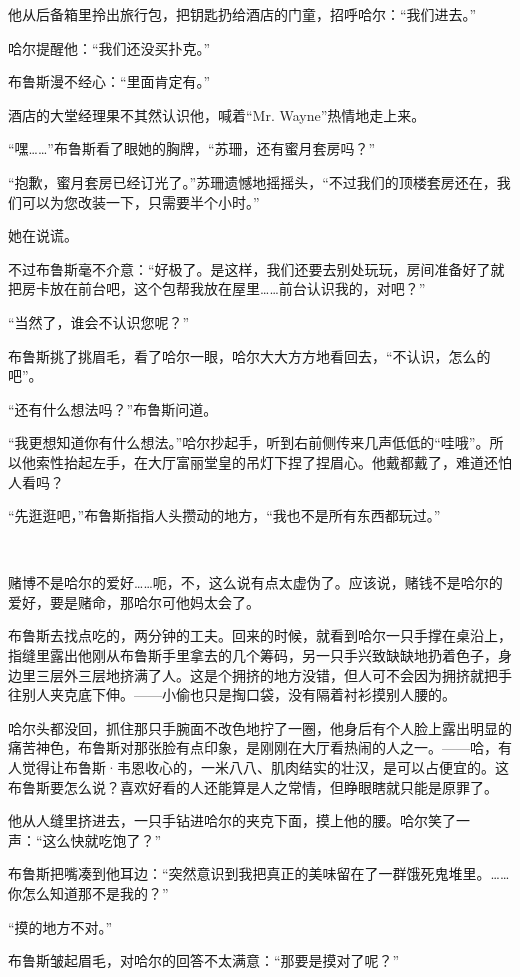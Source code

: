\documentclass[../main]{subfiles}
\begin{document}
他从后备箱里拎出旅行包，把钥匙扔给酒店的门童，招呼哈尔：“我们进去。”

哈尔提醒他：“我们还没买扑克。”

布鲁斯漫不经心：“里面肯定有。”

酒店的大堂经理果不其然认识他，喊着“Mr. Wayne”热情地走上来。

“嘿……”布鲁斯看了眼她的胸牌，“苏珊，还有蜜月套房吗？”

“抱歉，蜜月套房已经订光了。”苏珊遗憾地摇摇头，“不过我们的顶楼套房还在，我们可以为您改装一下，只需要半个小时。”

她在说谎。

不过布鲁斯毫不介意：“好极了。是这样，我们还要去别处玩玩，房间准备好了就把房卡放在前台吧，这个包帮我放在屋里……前台认识我的，对吧？”

“当然了，谁会不认识您呢？”

布鲁斯挑了挑眉毛，看了哈尔一眼，哈尔大大方方地看回去，“不认识，怎么的吧”。

“还有什么想法吗？”布鲁斯问道。

“我更想知道你有什么想法。”哈尔抄起手，听到右前侧传来几声低低的“哇哦”。所以他索性抬起左手，在大厅富丽堂皇的吊灯下捏了捏眉心。他戴都戴了，难道还怕人看吗？

“先逛逛吧，”布鲁斯指指人头攒动的地方，“我也不是所有东西都玩过。”

~\

赌博不是哈尔的爱好……呃，不，这么说有点太虚伪了。应该说，赌钱不是哈尔的爱好，要是赌命，那哈尔可他妈太会了。

布鲁斯去找点吃的，两分钟的工夫。回来的时候，就看到哈尔一只手撑在桌沿上，指缝里露出他刚从布鲁斯手里拿去的几个筹码，另一只手兴致缺缺地扔着色子，身边里三层外三层地挤满了人。这是个拥挤的地方没错，但人可不会因为拥挤就把手往别人夹克底下伸。——小偷也只是掏口袋，没有隔着衬衫摸别人腰的。

哈尔头都没回，抓住那只手腕面不改色地拧了一圈，他身后有个人脸上露出明显的痛苦神色，布鲁斯对那张脸有点印象，是刚刚在大厅看热闹的人之一。——哈，有人觉得让布鲁斯·韦恩收心的，一米八八、肌肉结实的壮汉，是可以占便宜的。这布鲁斯要怎么说？喜欢好看的人还能算是人之常情，但睁眼瞎就只能是原罪了。

他从人缝里挤进去，一只手钻进哈尔的夹克下面，摸上他的腰。哈尔笑了一声：“这么快就吃饱了？”

布鲁斯把嘴凑到他耳边：“突然意识到我把真正的美味留在了一群饿死鬼堆里。……你怎么知道那不是我的？”

“摸的地方不对。”

布鲁斯皱起眉毛，对哈尔的回答不太满意：“那要是摸对了呢？”
\end{document}
